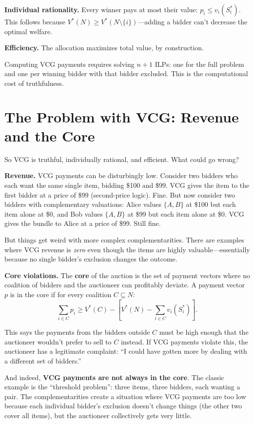 \documentclass[11pt]{article}
\begin{document}
\textbf{Individual rationality.} Every winner pays at most their value: $p_i \leq v_i(S_i^*)$. This follows because $V^*(N) \geq V^*(N \setminus \{i\})$---adding a bidder can't decrease the optimal welfare.

\textbf{Efficiency.} The allocation maximizes total value, by construction.

Computing VCG payments requires solving $n + 1$ ILPs: one for the full problem and one per winning bidder with that bidder excluded. This is the computational cost of truthfulness.

\section{The Problem with VCG: Revenue and the Core}

So VCG is truthful, individually rational, and efficient. What could go wrong?

\textbf{Revenue.} VCG payments can be disturbingly low. Consider two bidders who each want the same single item, bidding \$100 and \$99. VCG gives the item to the first bidder at a price of \$99 (second-price logic). Fine. But now consider two bidders with complementary valuations: Alice values $\{A, B\}$ at \$100 but each item alone at \$0, and Bob values $\{A, B\}$ at \$99 but each item alone at \$0. VCG gives the bundle to Alice at a price of \$99. Still fine.

But things get weird with more complex complementarities. There are examples where VCG revenue is \emph{zero} even though the items are highly valuable---essentially because no single bidder's exclusion changes the outcome.

\textbf{Core violations.} The \textbf{core} of the auction is the set of payment vectors where no coalition of bidders and the auctioneer can profitably deviate. A payment vector $p$ is in the core if for every coalition $C \subseteq N$:
\[
\sum_{i \in C} p_i \geq V^*(C) - \left[V^*(N) - \sum_{i \in C} v_i(S_i^*)\right].
\]

This says the payments from the bidders outside $C$ must be high enough that the auctioneer wouldn't prefer to sell to $C$ instead. If VCG payments violate this, the auctioneer has a legitimate complaint: ``I could have gotten more by dealing with a different set of bidders.''

And indeed, \textbf{VCG payments are not always in the core}. The classic example is the ``threshold problem'': three items, three bidders, each wanting a pair. The complementarities create a situation where VCG payments are too low because each individual bidder's exclusion doesn't change things (the other two cover all items), but the auctioneer collectively gets very little.
\end{document}
